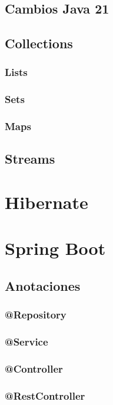 \documentclass[12pt,article,oneside]{memoir}
\begin{document}
		\section{Cambios Java 21}
		\newpage
		
		\section{Collections}
			\subsection{Lists}
			\newpage
			\subsection{Sets}
			\newpage
			\subsection{Maps}
		\newpage
		
		\section{Streams}
		\newpage
	
	\chapter{Hibernate}
	\newpage

	\chapter{Spring Boot}
		\section{Anotaciones}
			\subsection{@Repository}
			\subsection{@Service}
			\subsection{@Controller}
			\subsection{@RestController}
\end{document}
